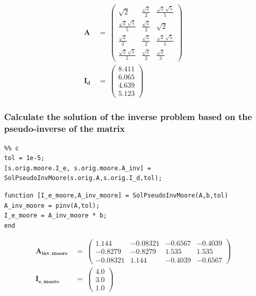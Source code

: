 \begin{align}
\mathbf{A}\ &=\ \left(\begin{array}{ccc} \sqrt{2} & \frac{\sqrt{2}}{2} & \frac{\sqrt{2}\,\sqrt{5}}{5}\\ \frac{\sqrt{2}\,\sqrt{5}}{5} & \frac{\sqrt{2}}{2} & \sqrt{2}\\ \frac{\sqrt{2}}{3} & \frac{\sqrt{2}}{2} & \frac{\sqrt{2}\,\sqrt{5}}{5}\\ \frac{\sqrt{2}\,\sqrt{5}}{5} & \frac{\sqrt{2}}{2} & \frac{\sqrt{2}}{3} \end{array}\right)\\
\mathbf{I_d}\ &=\ \left(\begin{array}{c} 8.411\\ 6.065\\ 4.639\\ 5.123 \end{array}\right)
\end{align}




\clearpage
\subsubsection{Calculate the solution of the inverse problem based on the pseudo‐inverse of the
matrix}
\begin{lstlisting}
%% c
tol = 1e-5;
[s.orig.moore.I_e, s.orig.moore.A_inv] = SolPseudoInvMoore(s.orig.A,s.orig.I_d,tol);
\end{lstlisting}
\begin{lstlisting}
function [I_e_moore,A_inv_moore] = SolPseudoInvMoore(A,b,tol)
A_inv_moore = pinv(A,tol);
I_e_moore = A_inv_moore * b;
end
\end{lstlisting}
\begin{align}
    \mathbf{A_{inv,moore}}\ &=\ \left(\begin{array}{cccc} 1.144 & -0.08321 & -0.6567 & -0.4039\\ -0.8279 & -0.8279 & 1.535 & 1.535\\ -0.08321 & 1.144 & -0.4039 & -0.6567 \end{array}\right)\\
    \mathbf{I_{e,moore}}\ &=\ \left(\begin{array}{c} 4.0\\ 3.0\\ 1.0 \end{array}\right)
\end{align}



